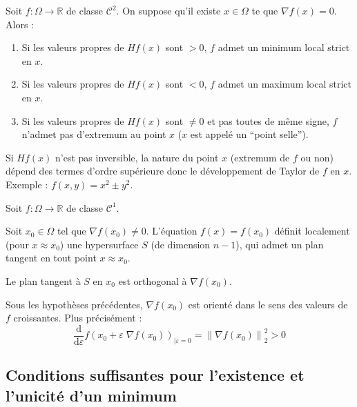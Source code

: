 \documentclass[a4paper,11pt]{article}
\newcommand{\R}{\mathbb{R}}
\newcommand{\norm}[1]{\left\lVert#1\right\rVert}
\newcommand{\der}[2]{\displaystyle\frac{\text{d}#1}{\text{d} #2}}
\theoremstyle{plain} %
\begin{document}
\begin{lemme}
    Soit $f : \Omega \longrightarrow \R$ de classe $\mathcal{C}^2$. On suppose qu'il existe
    $x \in \Omega$ te que $\nabla f(x) = 0$. Alors :
    \begin{enumerate}[label=-]
        \item Si les valeurs propres de $Hf(x)$ sont $> 0$, $f$ admet un minimum local strict
            en $x$.

        \item Si les valeurs propres de $Hf(x)$ sont $< 0$, $f$ admet un maximum local
            strict en $x$.

        \item Si les valeurs propres de $Hf(x)$ sont $\ne 0$ et pas toutes de même signe,
            $f$ n'admet pas d'extremum au point $x$ ($x$ est appelé un ``point selle'').
    \end{enumerate}
\end{lemme}

\begin{remark}
    Si $Hf(x)$ n'est pas inversible, la nature du point $x$ (extremum de $f$ ou non) dépend
    des termes d'ordre supérieure donc le développement de Taylor de $f$ en $x$. Exemple :
    $f(x,y) = x^2 \pm y^2$.
\end{remark}

\begin{lemme}
    Soit $f : \Omega \longrightarrow \R$ de classe $\mathcal{C}^1$.

    Soit $x_0 \in \Omega$ tel que $\nabla f(x_0) \ne 0$. L'équation $f(x) = f(x_0)$
    définit localement (pour $x \approx x_0$) une hypersurface $S$ (de dimension $n-1$),
    qui admet un plan tangent en tout point $x \approx x_0$.

    Le plan tangent à $S$ en $x_0$ est orthogonal à $\nabla f(x_0)$.
\end{lemme}

\begin{lemme}
    Sous les hypothèses précédentes, $\nabla f(x_0)$ est orienté dans le sens
    des valeurs de $f$ croissantes. Plus précisément :
    \[
        \der{}{\varepsilon} f(x_0 + \varepsilon \; \nabla f(x_0))_{|\varepsilon=0}
        = \norm{\nabla f(x_0)}^2_2 > 0
    \]
\end{lemme}

\subsection{Conditions suffisantes pour l'existence et l'unicité d'un minimum}
\end{document}
